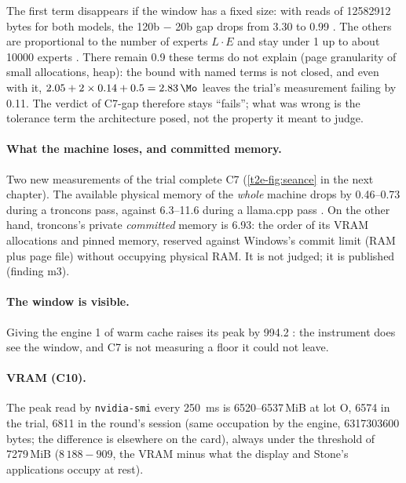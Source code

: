 The first term disappears if the window has a fixed size: with reads of \num{12582912} bytes for both models, the 120b $-$ 20b gap drops from \SI{3.30}{\Mo} to \SI{0.99}{\Mo} \mes. The others are proportional to the number of experts $L \cdot E$ and stay under \SI{1}{\Mo} up to about \num{10000} experts \calc. There remain \SI{0.9}{\Mo} these terms do not explain (page granularity of small allocations, heap): the bound with named terms is not closed, and even with it, $2.05 + 2 \times 0.14 + 0.5 = \SI{2.83}{\Mo}$ leaves the trial's measurement failing by \SI{0.11}{\Mo}. The verdict of C7-gap therefore stays ``fails''; what was wrong is the tolerance term the architecture posed, not the property it meant to judge.

\paragraph{What the machine loses, and committed memory.} Two new measurements of the trial complete C7 (\cref{t2e-fig:seance} in the next chapter). The available physical memory of the \emph{whole} machine drops by \SIrange{0.46}{0.73}{\Go} during a troncons pass, against \SIrange{6.3}{11.6}{\Go} during a llama.cpp pass \mes. On the other hand, troncons's private \emph{committed} memory is \SI{6.93}{\Go}: the order of its VRAM allocations and pinned memory, reserved against Windows's commit limit (RAM plus page file) without occupying physical RAM. It is not judged; it is published (finding m3).

\paragraph{The window is visible.} Giving the engine \SI{1}{\Go} of warm cache raises its peak by \SI{994.2}{\Mo} \mes: the instrument does see the window, and C7 is not measuring a floor it could not leave.

\paragraph{VRAM (C10).} The peak read by \texttt{nvidia-smi} every \SI{250}{\milli\second} is \numrange{6520}{6537}\,MiB at lot O, \num{6574} in the trial, \num{6811} in the round's session (same occupation by the engine, \num{6317303600} bytes; the difference is elsewhere on the card), always under the threshold of \num{7279}\,MiB ($8\,188 - 909$, the VRAM minus what the display and Stone's applications occupy at rest).

